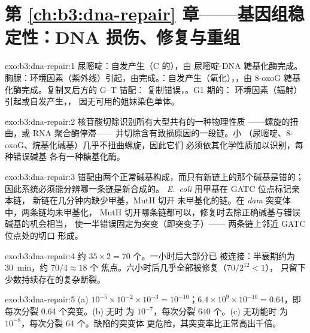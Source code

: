 \section*{第 \ref{ch:b3:dna-repair} 章——基因组稳定性：DNA 损伤、修复与重组}

\begin{solution}{exo:b3:dna-repair:1}
尿嘧啶：自发产生（C 的），由
尿嘧啶-DNA 糖基化酶完成。胸腺：环境因素（紫外线）引起，由完成。：自发产生（氧化），，由 8-oxoG 糖基化酶完成。复制叉后方的 G--T 错配：
复制错误，。G1 期的：
环境因素（辐射）引起或自发产生，，
因无可用的姐妹染色单体。
\end{solution}

\begin{solution}{exo:b3:dna-repair:2}
核苷酸切除识别所有大型共有的一种物理性质
——螺旋的扭曲，或 RNA 聚合酶停滞——
并切除含有致损原因的一段链。小
（尿嘧啶、8-oxoG、烷基化碱基）几乎不扭曲螺旋，因此它们
必须依其化学性质加以识别，每种错误碱基
各有一种糖基化酶。
\end{solution}

\begin{solution}{exo:b3:dna-repair:3}
错配由两个正常碱基构成，而只有新链上的那个碱基是错的；
因此系统必须能分辨哪一条链是新合成的。
\emph{E.~coli} 用甲基在 GATC 位点标记亲本链，
新链在几分钟内缺少甲基，MutH 切开
未甲基化的链。在 \emph{dam} 突变体中，两条链均未甲基化，
MutH 切开哪条链都可以，修复时去除正确碱基与错误碱基的机会相当，
使一半错误固定为突变（即突变子）——
两条链上邻近 GATC 位点处的切口
形成。
\end{solution}

\begin{solution}{exo:b3:dna-repair:4}
约 $35\times 2 = 70$ 个。一小时后大部分已
被连接：半衰期约为 \qty{30}{min}，约 $70/4 \approx 18$ 个
焦点。六小时后几乎全部被修复（$70/2^{12} < 1$），
只留下少数持续存在的复杂断裂。
\end{solution}

\begin{solution}{exo:b3:dna-repair:5}
(a) $10^{-5}\times 10^{-2}\times 10^{-3} = 10^{-10}$；$6.4\times
10^{9}\times 10^{-10} = 0.64$，即每次分裂 0.64 个突变。(b) 无时
为 $10^{-7}$，每次分裂 $640$ 个。(c) 无功能时
为 $10^{-8}$，每次分裂 $64$ 个。缺陷的突变体
更危险，其突变率比正常高出千倍。
\end{solution}


